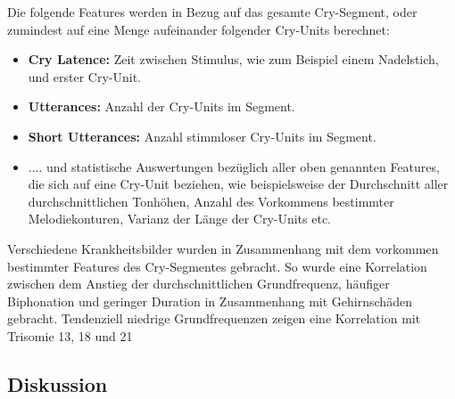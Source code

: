 Die folgende Features werden in Bezug auf das gesamte Cry-Segment, oder zumindest auf eine Menge aufeinander folgender Cry-Units berechnet:

\begin{itemize}
	\item \textbf{Cry Latence: } Zeit zwischen Stimulus, wie zum Beispiel einem Nadelstich, und erster Cry-Unit.
	\item \textbf{Utterances: } Anzahl der Cry-Units im Segment.
	\item \textbf{Short Utterances: } Anzahl stimmloser Cry-Units im Segment.
	\item .... und statistische Auswertungen bezüglich aller oben genannten Features, die sich auf eine Cry-Unit beziehen, wie beispielsweise der Durchschnitt aller durchschnittlichen Tonhöhen, Anzahl des Vorkommens bestimmter Melodiekonturen, Varianz der Länge der Cry-Units etc.\cite[S. 85]{parentalPerception}
\end{itemize}

Verschiedene Krankheitsbilder wurden in Zusammenhang mit dem vorkommen bestimmter Features des Cry-Segmentes gebracht. So wurde eine Korrelation zwischen dem Anstieg der durchschnittlichen Grundfrequenz, häufiger Biphonation und geringer Duration in Zusammenhang mit Gehirnschäden gebracht. Tendenziell niedrige Grundfrequenzen zeigen eine Korrelation mit Trisomie 13, 18 und 21\cite[S. 85]{parentalPerception}

\subsection{Diskussion}
\label{sec:cryDiscussion}

